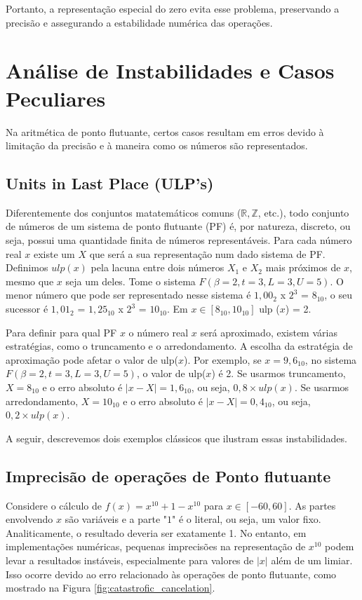Portanto, a representação especial do zero evita esse problema, preservando a precisão e assegurando a estabilidade numérica das operações.

\section{Análise de Instabilidades e Casos Peculiares}

Na aritmética de ponto flutuante, certos casos resultam em erros devido à limitação da precisão e à maneira como os números são representados. 

\subsection{Units in Last Place (ULP's)} 
Diferentemente dos conjuntos matatemáticos comuns ($\mathbb{R}, \mathbb{Z}$, etc.), todo conjunto de números de um sistema de ponto flutuante (PF) é, por natureza, discreto, ou seja, possui uma quantidade finita de números representáveis. Para cada número real $x$ existe um $X$ que será a sua representação num dado sistema de PF. Definimos $ulp(x)$ pela lacuna entre dois números $X_{1}$ e $X_{2}$ mais próximos de $x$, mesmo que $x$ seja um deles.
Tome o sistema $F(\beta = 2, t = 3, L = 3 , U = 5)$. O menor número que pode ser representado nesse sistema é $1{,}00_{2}$ x $2^{3}$ = $8_{10}$, o seu sucessor é $1{,}01_{2}$ = $1{,}25_{10}$ x $2^{3}$ = $10_{10}$.
Em $x \in [8_{10} , 10_{10}]$ ulp ($x$) = 2.

Para definir para qual PF $x$ o número real $x$ será aproximado, existem várias estratégias, como o truncamento e o arredondamento. A escolha da estratégia de aproximação pode afetar o valor de ulp($x$). Por exemplo, se $x = 9{,}6_{10}$, no sistema $F(\beta = 2, t = 3, L = 3 , U = 5)$, o valor de ulp($x$) é 2. Se usarmos truncamento, $X = 8_{10}$ e o erro absoluto é $|x - X| = 1{,}6_{10}$, ou seja, $0{,}8 \times ulp(x)$. Se usarmos arredondamento, $X = 10_{10}$ e o erro absoluto é $|x - X| = 0{,}4_{10}$, ou seja, $0{,}2 \times ulp(x)$.



A seguir, descrevemos dois exemplos clássicos que ilustram essas instabilidades.

\subsection{Imprecisão de operações de Ponto flutuante}
Considere o cálculo de $f(x) = x^{10} + 1 - x^{10}$ para \(x \in [-60, 60]\). As partes envolvendo $x$ são variáveis e a parte "$1$" é o literal, ou seja, um valor fixo. Analiticamente, o resultado deveria ser exatamente 1. No entanto, em implementações numéricas, pequenas imprecisões na representação de \(x^{10}\) podem levar a resultados instáveis, especialmente para valores de \(|x|\) além de um limiar. Isso ocorre devido ao erro relacionado às operações de ponto flutuante, como mostrado na Figura \ref{fig:catastrofic_cancelation}. 

